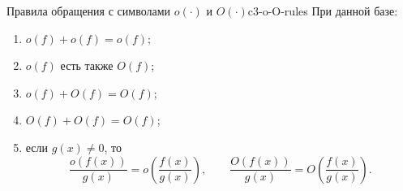 \begin{proposition}{Правила обращения с символами $o(\cdot)$ и $O(\cdot)$}{c3-o-O-rules}
  При данной базе:
  \begin{enumerate}[label=\alph*)]
    \item $o(f)+o(f)=o(f)$;
    \item $o(f)$ есть также $O(f)$;
    \item $o(f)+O(f)=O(f)$;
    \item $O(f)+O(f)=O(f)$;
    \item если $g(x)\ne0$, то
      \[
        \frac{o(f(x))}{g(x)}=o\!\left(\frac{f(x)}{g(x)}\right),
        \qquad
        \frac{O(f(x))}{g(x)}=O\!\left(\frac{f(x)}{g(x)}\right).
      \]
  \end{enumerate}
\end{proposition}
